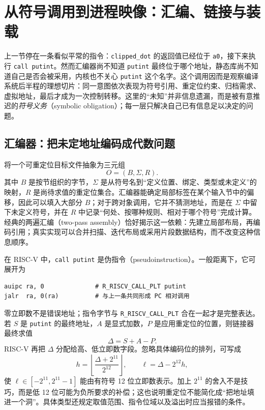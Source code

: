 \section{从符号调用到进程映像：汇编、链接与装载}
\label{sec:assembler-elf}
\label{sec:linker-loader}
\label{sec:validation}

上一节停在一条看似平常的指令：\texttt{clipped\_dot} 的返回值已经位于 \texttt{a0}，接下来执行 \texttt{call putint}。然而汇编器尚不知道 \texttt{putint} 最终位于哪个地址，静态库尚不知道自己是否会被采用，内核也不关心 \texttt{putint} 这个名字。这个调用因而是观察编译系统后半程的理想切片：同一意图依次表现为符号引用、重定位约束、归档需求、虚拟地址，最后才成为一次控制转移。这里的“未知”并非信息遗漏，而是被有意推迟的\emph{符号义务}（symbolic obligation）；每一层只解决自己已有信息足以决定的问题。



\subsection{汇编器：把未定地址编码成代数问题}

将一个可重定位目标文件抽象为三元组
\[
  O=(B,\Sigma,R).
\]
其中 \(B\) 是按节组织的字节，\(\Sigma\) 是从符号名到“定义位置、绑定、类型或未定义”的映射，\(R\) 是尚待求值的重定位集合。汇编器能确定局部标签在某个输入节中的偏移，因此可以填入大部分 \(B\)；对于跨对象调用，它并不猜测地址，而是在 \(\Sigma\) 中留下未定义符号，并在 \(R\) 中记录“何处、按哪种规则、相对于哪个符号”完成计算。经典的两遍汇编（two-pass assembly）恰好揭示这一依赖：先建立局部布局，再编码引用；真实实现可以合并扫描、迭代布局或采用片段数据结构，而不改变这种信息顺序。

在 RISC-V 中，\texttt{call putint} 是伪指令（pseudoinstruction）。一般距离下，它可展开为

\begin{verbatim}
auipc ra, 0              # R_RISCV_CALL_PLT putint
jalr  ra, 0(ra)          # 与上一条共同形成 PC 相对调用
\end{verbatim}

零立即数不是错误地址；指令字节与 \texttt{R\_RISCV\_CALL\_PLT} 合在一起才是完整表达。若 \(S\) 是 \texttt{putint} 的最终地址，\(A\) 是显式加数，\(P\) 是应用重定位的位置，则链接器最终求值
\begin{equation}
  \Delta=S+A-P. \label{eq:pc-relocation}
\end{equation}
RISC-V 再把 \(\Delta\) 分配给高、低立即数字段。忽略具体编码位的排列，可写成
\[
  h=\left\lfloor\frac{\Delta+2^{11}}{2^{12}}\right\rfloor,
  \qquad \ell=\Delta-2^{12}h,
\]
使 \(\ell\in[-2^{11},2^{11}-1]\) 能由有符号 12 位立即数表示。加上 \(2^{11}\) 的舍入不是技巧，而是低 12 位可能为负所要求的补偿；这也说明重定位不能简化成“把地址填进一个洞”。具体类型还规定取值范围、指令位域以及溢出时应当报错的条件\cite{bin-riscv-psabi}。

